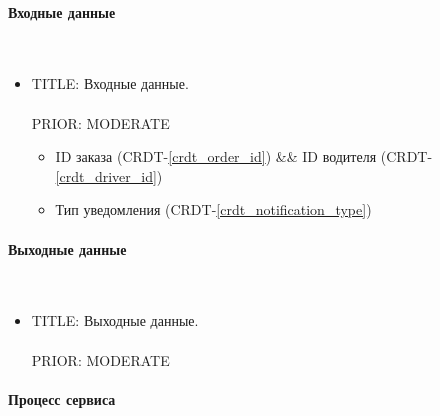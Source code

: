 	\paragraph{Входные данные} \mbox{} \\ \label{}

      \begin{itemize}

        \item{

          TITLE: Входные данные.\\
          \\
          PRIOR: MODERATE\\

        }

        \begin{itemize}
          \item ID заказа (CRDT-\ref{crdt_order_id}) \&\& ID водителя (CRDT-\ref{crdt_driver_id})
          \item Тип уведомления (CRDT-\ref{crdt_notification_type})
        \end{itemize}

      \end{itemize}

    \paragraph{Выходные данные} \mbox{} \\

      \begin{itemize}

        \item{

          TITLE: Выходные данные.\\
          \\
          PRIOR: MODERATE\\

        }

      \end{itemize}

    \paragraph{Процесс сервиса} \mbox{} \\

